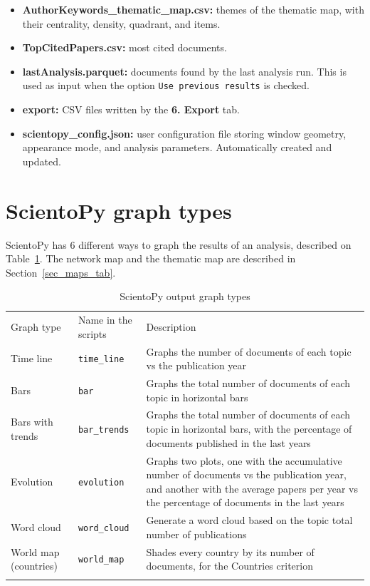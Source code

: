 \documentclass[10pt,letterpaper]{article}
\begin{document}
\begin{itemize}
	\item \textbf{AuthorKeywords\_thematic\_map.csv:} themes of the thematic map, with their centrality, density, quadrant, and items.

	\item \textbf{TopCitedPapers.csv:} most cited documents.

	\item \textbf{lastAnalysis.parquet:} documents found by the last analysis run. This is used as input when the option \verb|Use previous results| is checked.

	\item \textbf{export:} CSV files written by the \textbf{6. Export} tab.

	\item \textbf{scientopy\_config.json:} user configuration file storing window geometry, appearance mode, and analysis parameters. Automatically created and updated.
\end{itemize}

\newpage
\section{ScientoPy graph types}
\label{sec_graph_types}

ScientoPy has 6 different ways to graph the results of an analysis, described on Table~\ref{table_graph_types}. The network map and the thematic map are described in Section~\ref{sec_maps_tab}.

\begin{table}[!h]
	\centering
	\caption{ScientoPy output graph types}
	\label{table_graph_types}

	\renewcommand{\arraystretch}{1.5}
	\begin{tabular}{ p{4cm} p{3cm} p{10cm}}
	\hline\noalign{\smallskip}
	Graph type     &  Name in the scripts & Description                             \\
	\noalign{\smallskip}\hline\noalign{\smallskip}
	Time line      & \verb|time_line| & Graphs the number of documents of each topic vs the publication year \\
	Bars  & \verb|bar| & Graphs the total number of documents of each topic in horizontal bars \\
	Bars with trends  & \verb|bar_trends| & Graphs the total number of documents of each topic in horizontal bars, with the percentage of documents published in the last years \\
	Evolution     & \verb|evolution| & Graphs two plots, one with the accumulative number of documents vs the publication year, and another with the average papers per year vs the percentage of documents in the last years\\
	Word cloud     & \verb|word_cloud| & Generate a word cloud based on the topic total number of publications \\
	World map (countries)     & \verb|world_map| & Shades every country by its number of documents, for the Countries criterion \\
	\noalign{\smallskip}\hline
	\end{tabular}
\end{table}
\end{document}
